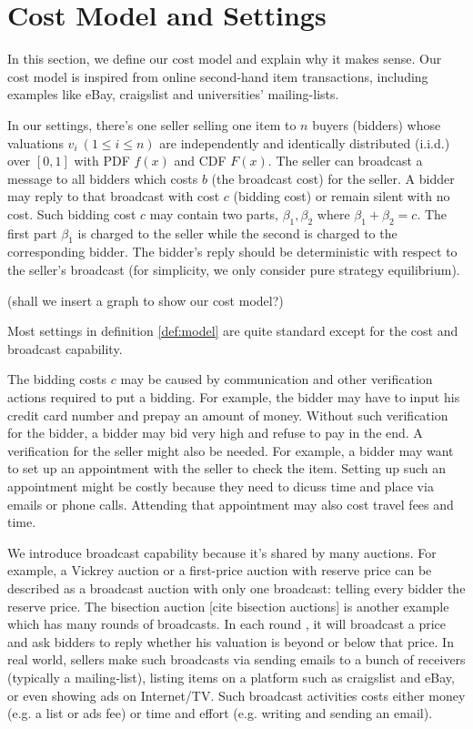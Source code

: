 \section{Cost Model and Settings}

In this section, we define our cost model and explain why it makes sense. Our
cost model is inspired from online second-hand item transactions, including
examples like eBay, craigslist and universities' mailing-lists.


\begin{definition}\label{def:model}

In our settings, there's one seller selling one item to $n$ buyers (bidders)
whose valuations $v_i~(1 \leq i \leq n)$ are independently and identically
distributed (i.i.d.) over $[0, 1]$ with PDF $f(x)$ and CDF $F(x)$. The seller
can broadcast a message to all bidders which costs $b$ (the broadcast cost) for
the seller.  A bidder may reply to that broadcast with cost $c$ (bidding cost)
or remain silent with no cost. Such bidding cost $c$ may contain two parts,
$\beta_1, \beta_2$ where $\beta_1+\beta_2 = c$.  The first part $\beta_1$ is
charged to the seller while the second is charged to the corresponding bidder.
The bidder's reply should be deterministic with respect to the seller's
broadcast (for simplicity, we only consider pure strategy equilibrium).

\end{definition}

(shall we insert a graph to show our cost model?)

Most settings in definition \ref{def:model} are quite standard except for the
cost and broadcast capability.

The bidding costs $c$ may be caused by communication and other verification
actions required to put a bidding. For example, the bidder may have to input
his credit card number and prepay an amount of money. Without such verification
for the bidder, a bidder may bid very high and refuse to pay in the end. A
verification for the seller might also be needed. For example, a bidder may
want to set up an appointment with the seller to check the item.  Setting up
such an appointment might be costly because they need to dicuss time and place
via emails or phone calls.  Attending that appointment may also cost travel
fees and time. 

We introduce broadcast capability because it's shared by many auctions.  For
example, a Vickrey auction or a first-price auction with reserve price can be
described as a broadcast auction with only one broadcast: telling every bidder
the reserve price. The bisection auction [cite bisection auctions] is another
example which has many rounds of broadcasts. In each round , it will broadcast
a price and ask bidders to reply whether his valuation is beyond or below that
price.  In real world, sellers make such broadcasts via sending emails to a
bunch of receivers (typically a mailing-list), listing items on a platform such
as craigslist and eBay, or even showing ads on Internet/TV. Such broadcast
activities costs either money (e.g. a list or ads fee) or time and effort (e.g.
writing and sending an email).

